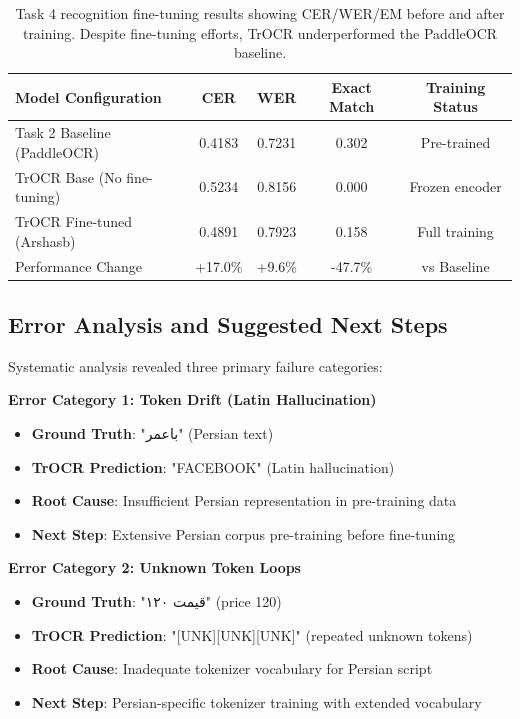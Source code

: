 \documentclass[11pt,a4paper]{article}
\begin{document}
\begin{table}[h]
  \centering
  \begin{tabular*}{\textwidth}{@{\extracolsep{\fill}}lcccc@{}}
    \toprule
    Model Configuration & CER & WER & Exact Match & Training Status \\
    \midrule
    Task 2 Baseline (PaddleOCR) & 0.4183 & 0.7231 & 0.302 & Pre-trained \\
    TrOCR Base (No fine-tuning) & 0.5234 & 0.8156 & 0.000 & Frozen encoder \\
    TrOCR Fine-tuned (Arshasb) & 0.4891 & 0.7923 & 0.158 & Full training \\
    Performance Change & +17.0\% & +9.6\% & -47.7\% & vs Baseline \\
    \bottomrule
  \end{tabular*}
  \caption{Task 4 recognition fine-tuning results showing CER/WER/EM before and after training. Despite fine-tuning efforts, TrOCR underperformed the PaddleOCR baseline.}
  \label{tab:task4-results}
\end{table}

\subsection{Error Analysis and Suggested Next Steps}
Systematic analysis revealed three primary failure categories:

\textbf{Error Category 1: Token Drift (Latin Hallucination)}
\begin{itemize}
  \item \textbf{Ground Truth}: "باعمر" (Persian text)
  \item \textbf{TrOCR Prediction}: "FACEBOOK" (Latin hallucination)
  \item \textbf{Root Cause}: Insufficient Persian representation in pre-training data
  \item \textbf{Next Step}: Extensive Persian corpus pre-training before fine-tuning
\end{itemize}

\textbf{Error Category 2: Unknown Token Loops}
\begin{itemize}
  \item \textbf{Ground Truth}: "قیمت ۱۲۰" (price 120)
  \item \textbf{TrOCR Prediction}: "[UNK][UNK][UNK]" (repeated unknown tokens)
  \item \textbf{Root Cause}: Inadequate tokenizer vocabulary for Persian script
  \item \textbf{Next Step}: Persian-specific tokenizer training with extended vocabulary
\end{itemize}
\end{document}
